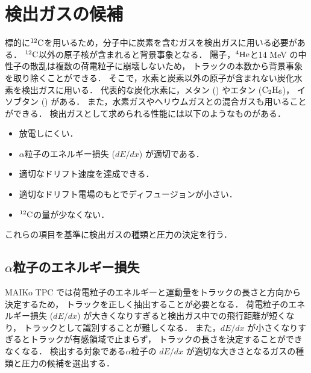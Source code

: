 \documentclass[../master]{subfiles}
\begin{document}
\section{検出ガスの候補}
\label{sec::detection_gas_candidate}
標的に${}^{12}{\rm C}$を用いるため，分子中に炭素を含むガスを検出ガスに用いる必要がある．
${}^{12}{\rm C}$以外の原子核が含まれると背景事象となる．
陽子，${}^{4}{\rm He}$と14 MeV の中性子の散乱は複数の荷電粒子に崩壊しないため，
トラックの本数から背景事象を取り除くことができる．
そこで，水素と炭素以外の原子が含まれない炭化水素を検出ガスに用いる．
代表的な炭化水素に，メタン (\Methane) やエタン (${\rm C_{2}H_{6}}$)，
イソブタン (\isoButane) がある．
また，水素ガスやヘリウムガスとの混合ガスも用いることができる．
検出ガスとして求められる性能には以下のようなものがある．
\begin{itemize}
\item
  放電しにくい．
\item
  $\alpha$粒子のエネルギー損失 ($dE/dx$) が適切である．
\item
  適切なドリフト速度を達成できる．
\item
  適切なドリフト電場のもとでディフュージョンが小さい．
\item
  ${}^{12}{\rm C}$の量が少なくない．
\end{itemize}
これらの項目を基準に検出ガスの種類と圧力の決定を行う．

\subsection{$\alpha$粒子のエネルギー損失}
MAIKo TPC では荷電粒子のエネルギーと運動量をトラックの長さと方向から決定するため，
トラックを正しく抽出することが必要となる．
荷電粒子のエネルギー損失 ($dE/dx$) が大きくなりすぎると検出ガス中での飛行距離が短くなり，
トラックとして識別することが難しくなる．
また，$dE/dx$ が小さくなりすぎるとトラックが有感領域で止まらず，
トラックの長さを決定することができなくなる．
検出する対象である$\alpha$粒子の $dE/dx$ が適切な大きさとなるガスの種類と圧力の候補を選出する．
\end{document}
